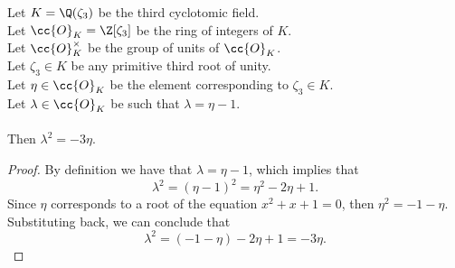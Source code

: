 \begin{lemma}
    \label{lmm:lambda_sq}
    \leanok
    Let $K = \Q(\zeta_3)$ be the third cyclotomic field. \\
    Let $\cc{O}_K = \Z[\zeta_3]$ be the ring of integers of $K$. \\
    Let $\cc{O}^\times_K$ be the group of units of $\cc{O}_K$. \\
    Let $\zeta_3 \in K$ be any primitive third root of unity. \\
    Let $\eta \in \cc{O}_K$ be the element corresponding to $\zeta_3 \in K$. \\
    Let $\lambda \in \cc{O}_K$ be such that $\lambda = \eta -1$. \\\\
    Then $\lambda^2 = -3 \eta$.
\end{lemma}
\begin{proof}
    \leanok
    By definition we have that $\lambda = \eta -1$, which implies that
    $$\lambda^2 = (\eta - 1)^2 = \eta^2 - 2\eta + 1.$$
    Since $\eta$ corresponds to a root of the equation $x^2 + x + 1 = 0$, then $\eta^2 = -1 - \eta$.
    Substituting back, we can conclude that
    $$\lambda^2 = (-1 - \eta) - 2\eta + 1 = -3\eta.$$
\end{proof}

